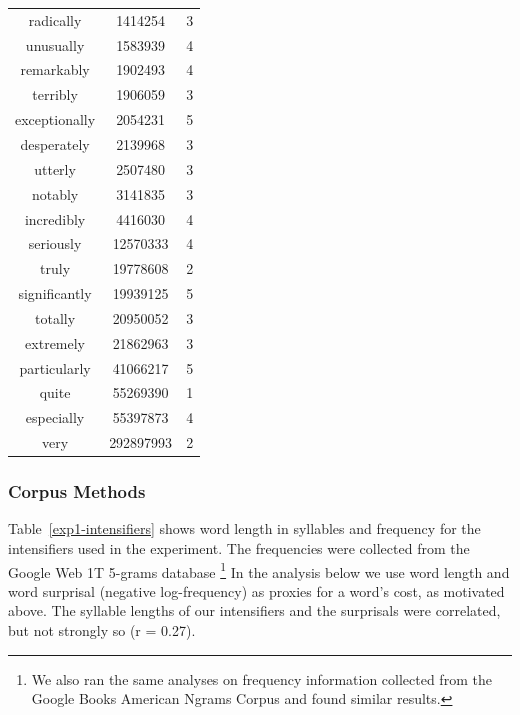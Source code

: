 \documentclass[10pt,letterpaper]{article}
\newcommand{\w}[1]{\emph{#1}}
\newcommand{\todo}[1]{{\color{red}#1}}
\begin{document}
\begin{table}[ht]
\begin{center}
\begin{tabular}{ccc}
    radically & 1414254 & 3 \\
    unusually & 1583939 & 4 \\
    remarkably & 1902493 & 4 \\
    terribly & 1906059 & 3 \\
    exceptionally & 2054231 & 5 \\
    desperately & 2139968 & 3 \\
    utterly & 2507480 & 3 \\
    notably & 3141835 & 3 \\
    incredibly & 4416030 & 4 \\
    seriously & 12570333 & 4 \\
    truly & 19778608 & 2 \\
    significantly & 19939125 & 5 \\
    totally & 20950052 & 3 \\
    extremely & 21862963 & 3 \\
    particularly & 41066217 & 5 \\
    quite & 55269390 & 1 \\
    especially & 55397873 & 4 \\
    very & 292897993 & 2
  \end{tabular}
 \end{center}
\end{table}

\subsubsection{Corpus Methods}

Table~\ref{exp1-intensifiers} shows word length in syllables and frequency for the intensifiers used in the experiment.
The frequencies were collected from the Google Web 1T 5-grams database \cite{web1t5gram}\footnote{
We also ran the same analyses on frequency information collected from the Google Books American Ngrams Corpus \cite{books2011} and found similar results.
}
In the analysis below we use word length and word surprisal (negative log-frequency) as proxies for a word's cost, as motivated above.
The syllable lengths of our intensifiers and the surprisals %
were correlated, but not strongly so (r = 0.27).
\end{document}
